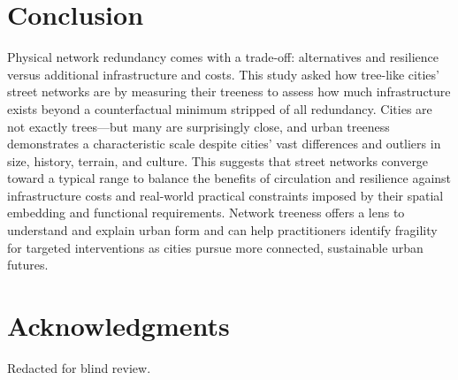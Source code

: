 \documentclass[12pt,letterpaper]{article} %
\begin{document}
\section{Conclusion}

Physical network redundancy comes with a trade-off: alternatives and resilience versus additional infrastructure and costs. This study asked how tree-like cities' street networks are by measuring their treeness to assess how much infrastructure exists beyond a counterfactual minimum stripped of all redundancy. Cities are not exactly trees---but many are surprisingly close, and urban treeness demonstrates a characteristic scale despite cities' vast differences and outliers in size, history, terrain, and culture. This suggests that street networks converge toward a typical range to balance the benefits of circulation and resilience against infrastructure costs and real-world practical constraints imposed by their spatial embedding and functional requirements. Network treeness offers a lens to understand and explain urban form and can help practitioners identify fragility for targeted interventions as cities pursue more connected, sustainable urban futures.

\section*{Acknowledgments}

Redacted for blind review.


\setlength{\bibsep}{0.00cm plus 0.05cm} %


\end{document}
